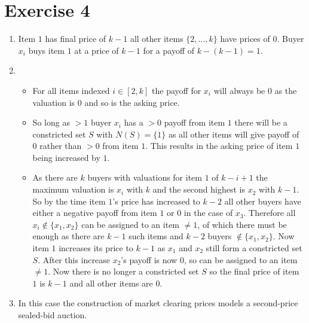 \documentclass[]{article}
\begin{document}
\section*{Exercise 4}
\begin{enumerate}
	\item
	Item $1$ has final price of $k-1$ all other items $\{2,...,k\}$ have prices of $0$. Buyer $x_i$ buys item $1$ at a price of $k-1$ for a payoff of $k-(k-1)=1$.
	\item
	\begin{itemize}
		\item
		For all items indexed $i\in [2,k]$ the payoff for $x_i$ will always be 0 as the valuation is $0$ and so is the asking price.
		\item
		So long as $>1$ buyer $x_i$ has a $>0$ payoff from item $1$ there will be a constricted set $S$ with $N(S)=\{1\}$ as all other items will give payoff of 0 rather than $>0$ from item $1$. This results in the asking price of item $1$ being increased by $1$.
		\item
		As there are $k$ buyers with valuations for item $1$ of $k-i+1$ the maximum valuation is $x_i$ with $k$ and the second highest is $x_2$ with $k-1$. So by the time item $1$'s price has increased to $k-2$ all other buyers have either a negative payoff from item $1$ or $0$ in the case of $x_3$. Therefore all $x_i\notin \{x_1,x_2\}$ can be assigned to an item $\neq1$, of which there must be enough as there are $k-1$ such items and $k-2$ buyers $\notin \{x_1,x_2\}$. Now item $1$ increases its price to $k-1$ as $x_1$ and $x_2$ still form a constricted set $S$. After this increase $x_2$'s payoff is now $0$, so can be assigned to an item $\neq1$. Now there is no longer a constricted set $S$ so the final price of item $1$ is $k-1$ and all other items are $0$.
	\end{itemize}
	\item
	In this case the construction of market clearing prices models a second-price sealed-bid auction.
\end{enumerate}
\end{document}

